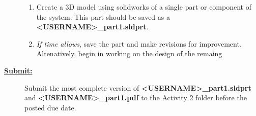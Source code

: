 \documentclass[12pt]{article}
\newcommand{\ANUM}{2} %
\begin{document}
\begin{description}
\begin{enumerate}
	\item Create a 3D model using solidworks of a single part or component of the system. This part should be saved as a {\bf \BL<USERNAME>\BK\_part1.sldprt}. 
	
	\item {\it If time allows}, save the part and make revisions for improvement. Altenatively, begin in working on the design of the remaing 
\end{enumerate}

\item[\textbf{\underline{Submit:}}] \hfill \vspace{0mm}

		Submit the most complete version of {\bf \BL<USERNAME>\BK\_part1.sldprt} \\and {\bf \BL<USERNAME>\BK\_part1.pdf } to the Activity \ANUM \hspace{1mm} folder before the posted due date.

\end{description}
\end{document}
